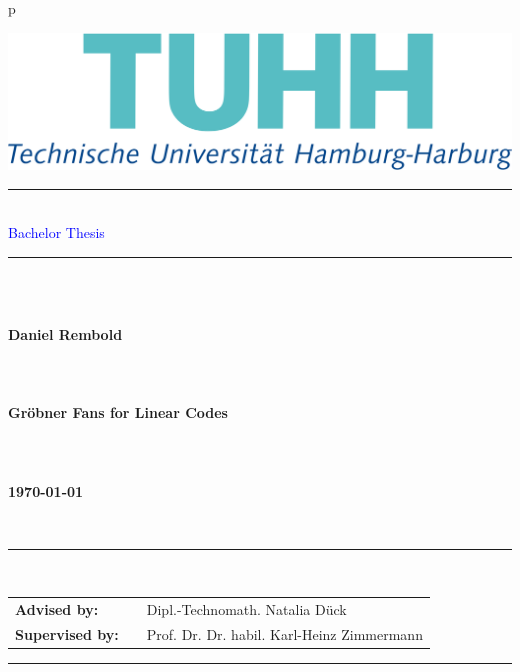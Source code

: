 \begin{tabular}{p{\textwidth}}
\begin{flushright}
\includegraphics[scale=0.15]{figures/tuhh.png}
\end{flushright}


\textcolor{gray}{\rule{15cm}{.8pt}}\\
\vspace{0.01cm}
\LARGE{\textsf{\textcolor{blue}{Bachelor Thesis}}} \\
\textcolor{gray}{\rule{15cm}{.8pt}}

~\\
~\\



\begin{center}
\textbf{\LARGE{Daniel Rembold}}
~\\
~\\
~\\
~\\
\textbf{\LARGE{Gröbner Fans for Linear Codes}}
~\\
~\\
~\\
~\\
\textbf{\large{\today}}
\end{center}

~\\
\begin{center}
\textcolor{gray}{\rule{15cm}{.8pt}}\\
\vspace{0.1cm}
\begin{tabular}{lll}
\textbf{Advised by:} & & Dipl.-Technomath. Natalia D\"uck \\
\textbf{Supervised by:} & & Prof. Dr. Dr. habil. Karl-Heinz Zimmermann\\
\end{tabular}
\textcolor{gray}{\rule{15cm}{.8pt}}\\
\end{center}

~\\



\end{tabular}
